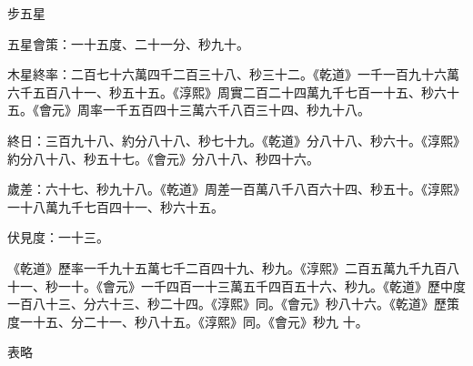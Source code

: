 \begin{pinyinscope}
 步五星



 五星會策：一十五度、二十一分、秒九十。



 木星終率：二百七十六萬四千二百三十八、秒三十二。《乾道》一千一百九十六萬六千五百八十一、秒五十五。《淳熙》周實二百二十四萬九千七百一十五、秒六十五。《會元》周率一千五百四十三萬六千八百三十四、秒九十八。



 終日：三百九十八、約分八十八、秒七十九。《乾道》分八十八、秒六十。《淳熙》約分八十八、秒五十七。《會元》分八十八、秒四十六。



 歲差：六十七、秒九十八。《乾道》周差一百萬八千八百六十四、秒五十。《淳熙》一十八萬九千七百四十一、秒六十五。



 伏見度：一十三。



 《乾道》歷率一千九十五萬七千二百四十九、秒九。《淳熙》二百五萬九千九百八十一、秒一十。《會元》一千四百一十三萬五千四百五十六、秒九。《乾道》歷中度一百八十三、分六十三、秒二十四。《淳熙》同。《會元》秒八十六。《乾道》歷策度一十五、分二十一、秒八十五。《淳熙》同。《會元》秒九
 十。



 表略



\end{pinyinscope}